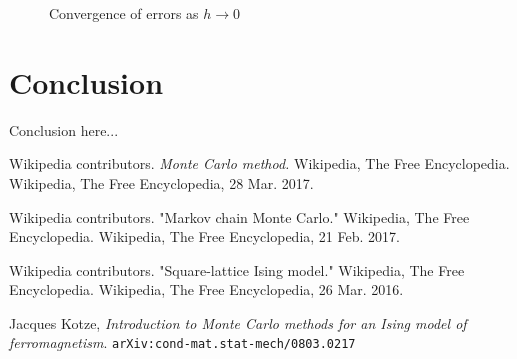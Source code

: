 \documentclass{article}
\begin{document}
\begin{figure}[H]
  \begin{center}
  \end{center}
  \caption{Convergence of errors as $h\to 0$}
  \label{fig:mag_susc}
\end{figure}

\section{Conclusion}

Conclusion here...

\begin{thebibliography}{9}

    Wikipedia contributors. \emph{Monte Carlo method.} Wikipedia, The Free Encyclopedia. Wikipedia, The Free Encyclopedia, 28 Mar. 2017.

    Wikipedia contributors. "Markov chain Monte Carlo." Wikipedia, The Free Encyclopedia. Wikipedia, The Free Encyclopedia, 21 Feb. 2017.

    Wikipedia contributors. "Square-lattice Ising model." Wikipedia, The Free Encyclopedia. Wikipedia, The Free Encyclopedia, 26 Mar. 2016.

  	  Jacques Kotze,
  	  \emph{Introduction to Monte Carlo methods for an Ising model of ferromagnetism}.
      \tt{arXiv:cond-mat.stat-mech/0803.0217}

\end{thebibliography}
\end{document}
